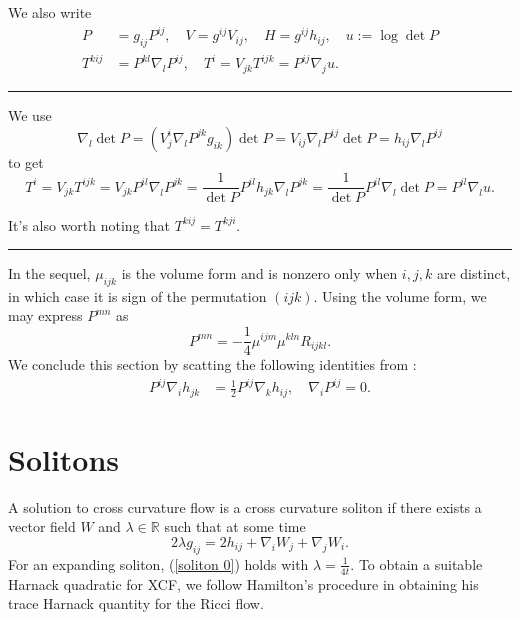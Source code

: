 \documentclass{amsart}
\theoremstyle{definition}
\theoremstyle{remark}
\numberwithin{equation}{section}
\newenvironment{note}{\hrule}{\hrule}
\begin{document}
We also write
\begin{align}
P&=g_{ij}P^{ij},\quad V=g^{ij}V_{ij},\quad H=g^{ij}h_{ij},\quad u:=\log\det P\\
T^{kij}&=P^{kl}\nabla_l P^{ij},\quad T^i=V_{jk}T^{ijk}=P^{ij}\nabla_ju.
\end{align}

\begin{note}
We use
\[
\nabla_l \det P = (V^i_j \nabla_l P^{jk} g_{ik}) \det P = V_{ij} \nabla_l P^{ij} \det P = h_{ij} \nabla_l P^{ij}
\]
to get
\[
T^i = V_{jk}T^{ijk} = V_{jk} P^{il}\nabla_l P^{jk} = \frac{1}{\det P} P^{il} h_{jk} \nabla_l P^{jk} = \frac{1}{\det P} P^{il} \nabla_l \det P = P^{il} \nabla_l u.
\]

It's also worth noting that \(T^{kij} = T^{kji}\).
\end{note}

In the sequel, $\mu_{ijk}$ is the volume form and is nonzero only when $i,j,k$ are distinct, in which case it is sign of the permutation $(ijk)$. Using the volume form, we may express $P^{mn}$ as
\begin{equation}
P^{mn}=-\frac{1}{4}\mu^{ijm}\mu^{kln}R_{ijkl}.
\end{equation}
We conclude this section by scatting the following identities from \cite[Lemma 1]{Chowcross2002}:
\begin{align}\label{equ: important}
P^{ij}\nabla_ih_{jk}&=\frac{1}{2}P^{ij}\nabla_kh_{ij},\quad
\nabla_iP^{ij}=0.
\end{align}
\section{Solitons}
A solution to cross curvature flow is a cross curvature soliton if there exists a vector field $W$ and $\lambda\in \mathbb{R}$ such that at some time
\begin{equation}\label{soliton 0}
2\lambda g_{ij}=2h_{ij}+\nabla_iW_j+\nabla_jW_i.
\end{equation}
For an expanding soliton, (\ref{soliton 0}) holds with $\lambda=\frac{1}{4t}.$
To obtain a suitable Harnack quadratic for XCF, we follow Hamilton's procedure in obtaining his trace Harnack quantity for the Ricci flow.
\end{document}
